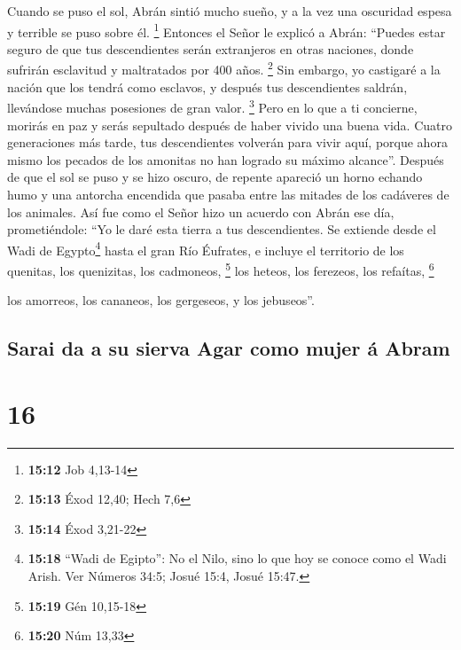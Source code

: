  Cuando se puso el sol, Abrán sintió mucho sueño, y a la
vez una oscuridad espesa y terrible se puso sobre él. \footnote{\textbf{15:12}
  Job 4,13-14}  Entonces el Señor le explicó a Abrán:
``Puedes estar seguro de que tus descendientes serán extranjeros en
otras naciones, donde sufrirán esclavitud y maltratados por 400 años.
\footnote{\textbf{15:13} Éxod 12,40; Hech 7,6}  Sin
embargo, yo castigaré a la nación que los tendrá como esclavos, y
después tus descendientes saldrán, llevándose muchas posesiones de gran
valor. \footnote{\textbf{15:14} Éxod 3,21-22}  Pero en lo
que a ti concierne, morirás en paz y serás sepultado después de haber
vivido una buena vida.  Cuatro generaciones más tarde,
tus descendientes volverán para vivir aquí, porque ahora mismo los
pecados de los amonitas no han logrado su máximo alcance''.
 Después de que el sol se puso y se hizo oscuro, de
repente apareció un horno echando humo y una antorcha encendida que
pasaba entre las mitades de los cadáveres de los animales.
 Así fue como el Señor hizo un acuerdo con Abrán ese día,
prometiéndole: ``Yo le daré esta tierra a tus descendientes. Se extiende
desde el Wadi de Egypto\footnote{\textbf{15:18} ``Wadi de Egipto'': No
  el Nilo, sino lo que hoy se conoce como el Wadi Arish. Ver Números
  34:5; Josué 15:4, Josué 15:47.} hasta el gran Río Éufrates,
 e incluye el territorio de los quenitas, los quenizitas,
los cadmoneos, \footnote{\textbf{15:19} Gén 10,15-18} 
los heteos, los ferezeos, los refaítas, \footnote{\textbf{15:20} Núm
  13,33}

 los amorreos, los cananeos, los gergeseos, y los
jebuseos''.

\hypertarget{sarai-da-a-su-sierva-agar-como-mujer-uxe1-abram}{%
\subsection{Sarai da a su sierva Agar como mujer á
Abram}\label{sarai-da-a-su-sierva-agar-como-mujer-uxe1-abram}}

\hypertarget{section-15}{%
\section{16}\label{section-15}}

